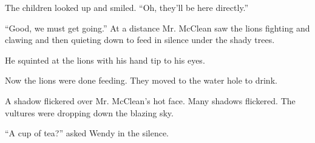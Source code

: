 \documentclass[10pt,a4paper]{article}
\begin{document}
The children looked up and smiled. “Oh, they’ll be here directly.”

“Good, we must get going.” At a distance Mr. McClean saw the lions fighting and clawing and then quieting down to feed in silence under the shady trees.

He squinted at the lions with his hand tip to his eyes.

Now the lions were done feeding. They moved to the water hole to drink.

A shadow flickered over Mr. McClean’s hot face. Many shadows flickered. The vultures were dropping down the blazing sky.

“A cup of tea?” asked Wendy in the silence.
\end{document}
